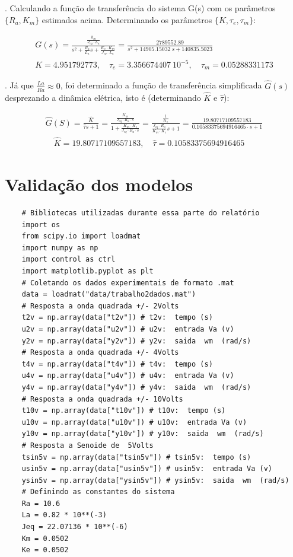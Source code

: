 \documentclass[10pt]{article}
\begin{document}
. Calculando a função de transferência do sistema G(s) com os parâmetros $\{ R_a, K_m \}$
estimados acima. Determinando os parâmetros $\{K,\tau_e, \tau_m\}$:

\begin{equation}
\begin{aligned}
    G(s) = \frac{\frac{k_m}{J_{eq} \cdot L_a}}{s^2 + \frac{R_a}{L_a}s + \frac{K_e \cdot K_m}{J_{eq} \cdot L_a}} = \frac{2789552.89}{s^2 + 14905.15032 \ s + 140835.5023} \\
    K = 4.951792773, \quad \tau_e = 3.356674407 \ 10^{-5}, \quad \tau_m = 0.05288331173 
\end{aligned}
\end{equation}

. Já que $\frac{La}{Ra} \approx 0$, foi determinado a função de transferência simplificada $\hat{G}(s)$ desprezando a dinâmica elétrica, isto é (determinando $\hat{K}$ e $\hat{\tau}$):

\begin{equation}
\begin{aligned}
    \hat{G}(S) = \frac{\hat{K}}{\hat{\tau}s + 1}
    = \frac{\frac{K_m}{J_{eq} \cdot R_a \cdot s}}{1 + \frac{K_m \cdot K_e}{J_{eq} \cdot R_a \cdot s}}
    = \frac{\frac{1}{K_e}}{\frac{J_{eq} \cdot R_a}{K_m \cdot K_e}s + 1}
    = \frac{19.80717109557183}{0.10583375694916465 \cdot s + 1} \\
    \quad \hat{K} = 19.80717109557183,
    \quad \hat{\tau} = 0.10583375694916465 
\end{aligned}
\end{equation}

\section{Validação dos modelos}

\begin{verbatim}
    # Bibliotecas utilizadas durante essa parte do relatório
    import os
    from scipy.io import loadmat
    import numpy as np
    import control as ctrl
    import matplotlib.pyplot as plt
    # Coletando os dados experimentais de formato .mat
    data = loadmat("data/trabalho2dados.mat")
    # Resposta a onda quadrada +/- 2Volts
    t2v = np.array(data["t2v"]) # t2v:  tempo (s)
    u2v = np.array(data["u2v"]) # u2v:  entrada Va (v)
    y2v = np.array(data["y2v"]) # y2v:  saida  wm  (rad/s)
    # Resposta a onda quadrada +/- 4Volts
    t4v = np.array(data["t4v"]) # t4v:  tempo (s)
    u4v = np.array(data["u4v"]) # u4v:  entrada Va (v)
    y4v = np.array(data["y4v"]) # y4v:  saida  wm  (rad/s)
    # Resposta a onda quadrada +/- 10Volts
    t10v = np.array(data["t10v"]) # t10v:  tempo (s)
    u10v = np.array(data["u10v"]) # u10v:  entrada Va (v)
    y10v = np.array(data["y10v"]) # y10v:  saida  wm  (rad/s)
    # Resposta a Senoide de  5Volts 
    tsin5v = np.array(data["tsin5v"]) # tsin5v:  tempo (s)
    usin5v = np.array(data["usin5v"]) # usin5v:  entrada Va (v)
    ysin5v = np.array(data["ysin5v"]) # ysin5v:  saida  wm  (rad/s)
    # Definindo as constantes do sistema
    Ra = 10.6
    La = 0.82 * 10**(-3)
    Jeq = 22.07136 * 10**(-6)
    Km = 0.0502
    Ke = 0.0502
\end{verbatim}
\end{document}
